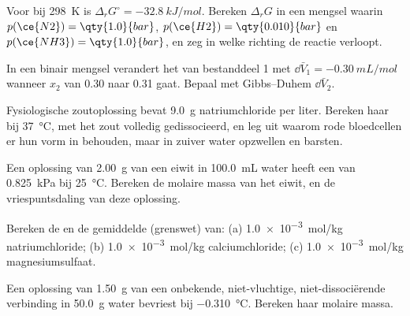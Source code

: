 \begin{exercise}[$\star$]\label{exo:b2:chemical-potential:4}
Voor  bij \qty{298}{K} is $\Delta_r G^\circ =
\qty{-32.8}{kJ/mol}$. Bereken $\Delta_r G$ in een mengsel waarin
$p(\ce{N2}) = \qty{1.0}{bar}$, $p(\ce{H2}) = \qty{0.010}{bar}$ en
$p(\ce{NH3}) = \qty{1.0}{bar}$, en zeg in welke richting de reactie verloopt.
\end{exercise}

\begin{exercise}[$\star\star$]\label{exo:b2:chemical-potential:5}
In een binair mengsel verandert het  van bestanddeel 1 met
$\dd\bar V_1 = \qty{-0.30}{mL/mol}$ wanneer $x_2$ van 0.30 naar 0.31 gaat. Bepaal
met Gibbs--Duhem $\dd\bar V_2$.
\end{exercise}

\begin{exercise}[$\star\star$]\label{exo:b2:chemical-potential:6}
Fysiologische zoutoplossing bevat \qty{9.0}{g} natriumchloride per liter.
Bereken haar  bij \qty{37}{\celsius}, met het zout volledig
gedissocieerd, en leg uit waarom rode bloedcellen er hun vorm in behouden, maar in zuiver water
opzwellen en barsten.
\end{exercise}

\begin{exercise}[$\star\star$]\label{exo:b2:chemical-potential:7}
Een oplossing van \qty{2.00}{g} van een eiwit in \qty{100.0}{mL} water heeft een
 van \qty{0.825}{kPa} bij \qty{25}{\celsius}. Bereken de molaire
massa van het eiwit, en de vriespuntsdaling van deze oplossing.
\end{exercise}

\begin{exercise}[$\star\star$]\label{exo:b2:chemical-potential:8}
Bereken de  en de gemiddelde  (grenswet)
van: (a) \qty{1.0e-3}{mol/kg} natriumchloride; (b) \qty{1.0e-3}{mol/kg}
calciumchloride; (c) \qty{1.0e-3}{mol/kg} magnesiumsulfaat.
\end{exercise}

\begin{exercise}[$\star\star$]\label{exo:b2:chemical-potential:9}
Een oplossing van \qty{1.50}{g} van een onbekende, niet-vluchtige, niet-dissociërende
verbinding in \qty{50.0}{g} water bevriest bij \qty{-0.310}{\celsius}. Bereken
haar molaire massa.
\end{exercise}

